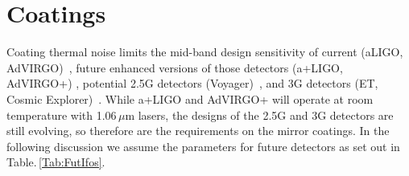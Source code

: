 \chapter{Coatings}
\label{sec:Coatings}

\vspace{1cm}



Coating thermal noise limits the mid-band design sensitivity of current (aLIGO, AdVIRGO)~\cite{ AdvancedLIGO2015,AdvancedVirgo2015}, future enhanced versions of those detectors (a+LIGO, AdVIRGO+) \cite{Zucker:LIGOAplus, Cagnoli:VirgoAplus}, potential 2.5G detectors (Voyager)~\cite{VoyagerDCC2018}, and 3G detectors (ET, Cosmic Explorer)~\cite{ET2011,CosmicExplorer2017}.  While a+LIGO and AdVIRGO+ will operate at room temperature with 1.06\,$\mu$m lasers, the designs of the 2.5G and 3G detectors are still evolving, so therefore are the requirements on the mirror coatings. In the following discussion we assume the parameters for future detectors as set out in Table.\,\ref{Tab:FutIfos}. 



